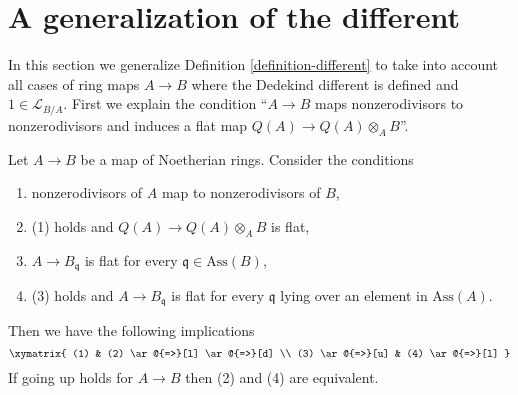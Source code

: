 \section{A generalization of the different}
\label{section-different-generalization}

\noindent
In this section we generalize Definition \ref{definition-different}
to take into account all cases of ring maps $A \to B$
where the Dedekind different is defined and $1 \in \mathcal{L}_{B/A}$.
First we explain the condition ``$A \to B$ maps nonzerodivisors to
nonzerodivisors and induces a flat map $Q(A) \to Q(A) \otimes_A B$''.

\begin{lemma}
\label{lemma-explain-condition}
Let $A \to B$ be a map of Noetherian rings. Consider the conditions
\begin{enumerate}
\item nonzerodivisors of $A$ map to nonzerodivisors of $B$,
\item (1) holds and $Q(A) \to Q(A) \otimes_A B$ is flat,
\item $A \to B_\mathfrak q$ is flat for every
$\mathfrak q \in \text{Ass}(B)$,
\item (3) holds and $A \to B_\mathfrak q$ is flat for every $\mathfrak q$
lying over an element in $\text{Ass}(A)$.
\end{enumerate}
Then we have the following implications
$$
\xymatrix{
(1) & (2) \ar@{=>}[l] \ar@{=>}[d] \\
(3) \ar@{=>}[u] & (4) \ar@{=>}[l]
}
$$
If going up holds for $A \to B$ then (2) and (4) are equivalent.
\end{lemma}

